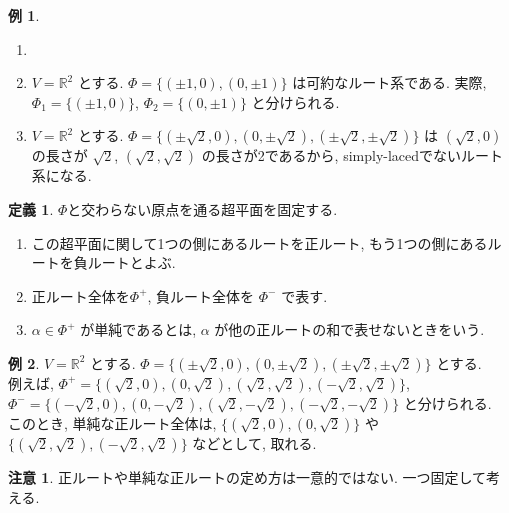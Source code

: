\documentclass[
  a4paper, 
  12pt,
  ja=standard,
  xelatex,
  left=30truemm,
  right=30truemm,
  titlepage 
]{bxjsarticle}
\theoremstyle{definition}
\newtheorem{df}{定義}
\newtheorem*{ex}{例}
\newtheorem*{re}{注意}
\begin{document}
\begin{ex}
  \begin{enumerate}
    \item[]
    \item $ V = \mathbb{R}^2$ とする. $ \Phi = \{ (\pm 1, 0), (0, \pm1) \}$ は可約なルート系である. 実際,
    $ \Phi_1 = \{ (\pm 1, 0)\}$, $ \Phi_2 = \{ (0, \pm 1)\}$ と分けられる.
    \item $ V = \mathbb{R}^2$ とする. $ \Phi = \{ (\pm \sqrt{2}, 0), (0, \pm\sqrt{2}), (\pm\sqrt{2}, \pm \sqrt{2}) \}$ は
    $(\sqrt{2}, 0)$ の長さが $\sqrt{2}$, $(\sqrt{2}, \sqrt{2})$ の長さが2であるから, simply-lacedでないルート系になる.
  \end{enumerate}
\end{ex}

\begin{df}
  $\Phi$と交わらない原点を通る超平面を固定する. 
  \begin{enumerate}
    \item この超平面に関して1つの側にあるルートを正ルート, もう1つの側にあるルートを負ルートとよぶ.
    \item 正ルート全体を$ \Phi^{+} $, 負ルート全体を $ \Phi^{-} $ で表す. 
    \item $\alpha \in \Phi^{+} $ が単純であるとは, $\alpha$ が他の正ルートの和で表せないときをいう.
  \end{enumerate}
\end{df}

\begin{ex}
  $ V = \mathbb{R}^2$ とする. $ \Phi = \{ (\pm \sqrt{2}, 0), (0, \pm\sqrt{2}), (\pm\sqrt{2}, \pm\sqrt{2}) \}$ とする. \\
  例えば, $\Phi^{+} = \{ ( \sqrt{2}, 0), (0, \sqrt{2}), (\sqrt{2}, \sqrt{2}), (-\sqrt{2}, \sqrt{2}) \}$, \\
  $\Phi^{-} = \{ ( -\sqrt{2}, 0), (0, -\sqrt{2}), (\sqrt{2}, -\sqrt{2}), (-\sqrt{2}, -\sqrt{2}) \}$ と分けられる.  \\
  このとき, 単純な正ルート全体は,  $\{ ( \sqrt{2}, 0), (0, \sqrt{2}) \}$ や $ \{ (\sqrt{2}, \sqrt{2}), (-\sqrt{2}, \sqrt{2}) \}$ などとして,
  取れる.
\end{ex}

\begin{re}
  正ルートや単純な正ルートの定め方は一意的ではない. 一つ固定して考える.
\end{re}
\end{document}

